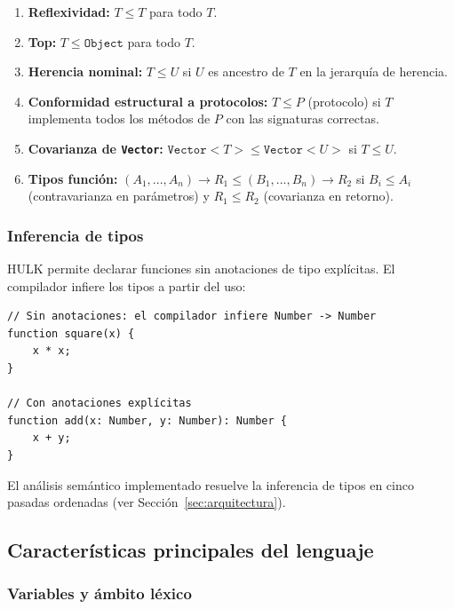 \documentclass[12pt, a4paper]{article}
\begin{document}
\begin{enumerate}[leftmargin=*, label=\arabic*.]
    \item \textbf{Reflexividad:} $T \leq T$ para todo $T$.
    \item \textbf{Top:} $T \leq \texttt{Object}$ para todo $T$.
    \item \textbf{Herencia nominal:} $T \leq U$ si $U$ es ancestro de $T$ en la
          jerarquía de herencia.
    \item \textbf{Conformidad estructural a protocolos:} $T \leq P$ (protocolo)
          si $T$ implementa todos los métodos de $P$ con las signaturas correctas.
    \item \textbf{Covarianza de \texttt{Vector}:} $\texttt{Vector}<T> \leq
          \texttt{Vector}<U>$ si $T \leq U$.
    \item \textbf{Tipos función:} $(A_1,...,A_n) \to R_1 \leq (B_1,...,B_n) \to R_2$
          si $B_i \leq A_i$ (contravarianza en parámetros) y $R_1 \leq R_2$
          (covarianza en retorno).
\end{enumerate}

\subsubsection{Inferencia de tipos}

HULK permite declarar funciones sin anotaciones de tipo explícitas. El
compilador infiere los tipos a partir del uso:

\begin{lstlisting}[caption={Inferencia de tipos en HULK}, label=lst:inference]
// Sin anotaciones: el compilador infiere Number -> Number
function square(x) {
    x * x;
}

// Con anotaciones explícitas
function add(x: Number, y: Number): Number {
    x + y;
}
\end{lstlisting}

El análisis semántico implementado resuelve la inferencia de tipos en cinco
pasadas ordenadas (ver Sección~\ref{sec:arquitectura}).

\subsection{Características principales del lenguaje}

\subsubsection{Variables y ámbito léxico}
\end{document}
